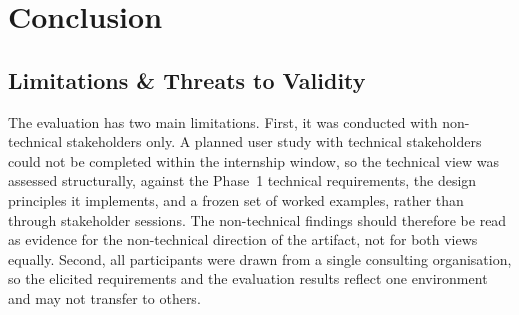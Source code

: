 \chapter{Conclusion}%
\label{ch:conclusion}




\section{Limitations \& Threats to Validity}

The evaluation has two main limitations. First, it was conducted with non-technical stakeholders only. A planned user study with technical stakeholders could not be completed within the internship window, so the technical view was assessed structurally, against the Phase~1 technical requirements, the design principles it implements, and a frozen set of worked examples, rather than through stakeholder sessions. The non-technical findings should therefore be read as evidence for the non-technical direction of the artifact, not for both views equally. Second, all participants were drawn from a single consulting organisation, so the elicited requirements and the evaluation results reflect one environment and may not transfer to others.

